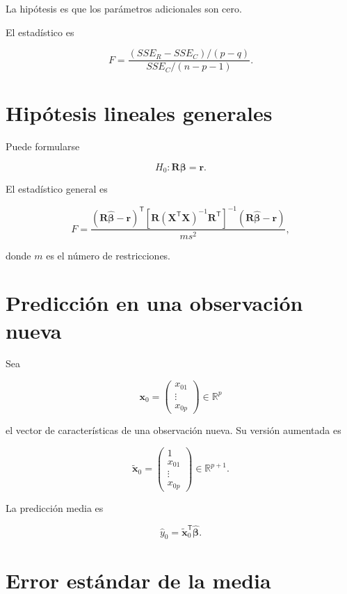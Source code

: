 \documentclass[
  spanish,
  11pt,
  letterpaper,
  DIV=11,
  numbers=noendperiod]{scrreprt}
\theoremstyle{definition}
\theoremstyle{plain}
\theoremstyle{definition}
\theoremstyle{remark}
\begin{document}
La hipótesis es que los parámetros adicionales son cero.

El estadístico es

\[
F
=
\frac{
(SSE_R-SSE_C)/(p-q)
}{
SSE_C/(n-p-1)
}.
\]

\section{Hipótesis lineales
generales}\label{hipuxf3tesis-lineales-generales}

Puede formularse

\[
H_0:
\mathbf{R}\boldsymbol{\beta}
=
\mathbf{r}.
\]

El estadístico general es

\[
F
=
\frac{
(\mathbf{R}\widehat{\boldsymbol{\beta}}-\mathbf{r})^{\mathsf T}
\left[
\mathbf{R}
(\mathbf{X}^{\mathsf T}\mathbf{X})^{-1}
\mathbf{R}^{\mathsf T}
\right]^{-1}
(\mathbf{R}\widehat{\boldsymbol{\beta}}-\mathbf{r})
}{
m s^2
},
\]

donde \(m\) es el número de restricciones.

\section{Predicción en una observación
nueva}\label{predicciuxf3n-en-una-observaciuxf3n-nueva}

Sea

\[
\mathbf{x}_0
=
\begin{pmatrix}
x_{01}\\
\vdots\\
x_{0p}
\end{pmatrix}
\in\mathbb{R}^{p}
\]

el vector de características de una observación nueva. Su versión
aumentada es

\[
\widetilde{\mathbf{x}}_0
=
\begin{pmatrix}
1\\
x_{01}\\
\vdots\\
x_{0p}
\end{pmatrix}
\in\mathbb{R}^{p+1}.
\]

La predicción media es

\[
\widehat{y}_0
=
\widetilde{\mathbf{x}}_0^{\mathsf T}
\widehat{\boldsymbol{\beta}}.
\]

\section{Error estándar de la
media}\label{error-estuxe1ndar-de-la-media}
\end{document}
